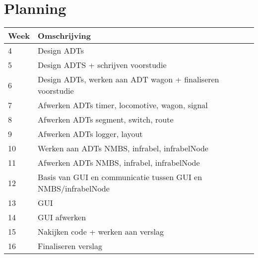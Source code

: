 \documentclass{article}
\begin{document}
\section{Planning}
\begin{center}
    \begin{tabular}{ | l | l |}
    \hline
    Week & Omschrijving \\ \hline
    4 & Design ADTs \\ \hline
    5 & Design ADTS + schrijven voorstudie \\ \hline
    6 & Design ADTs, werken aan ADT wagon + finaliseren voorstudie \\ \hline
    7 & Afwerken ADTs timer, locomotive, wagon, signal \\ \hline
    8 & Afwerken ADTs segment, switch, route \\ \hline
    9 & Afwerken ADTs logger, layout \\ \hline
    10 & Werken aan ADTs NMBS, infrabel, infrabelNode \\ \hline
    11 & Afwerken ADTs NMBS, infrabel, infrabelNode \\ \hline
    12 & Basis van GUI en communicatie tussen GUI en NMBS/infrabelNode \\ \hline
    13 & GUI \\ \hline
    14 & GUI afwerken \\ \hline
    15 & Nakijken code + werken aan verslag \\ \hline
    16 & Finaliseren verslag \\ \hline
    \end{tabular}
\end{center}
\end{document}
